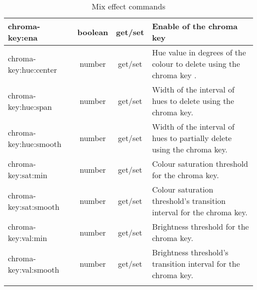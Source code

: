 \documentclass[../main.tex]{subfiles}
\begin{document}
\begin{landscape}
\begin{longtable}{|l|c|c|p{12cm}|}
    chroma-key:ena & boolean & get/set & Enable of the chroma key \\\hline
    chroma-key:hue:center & number & get/set & Hue value in degrees of the colour to delete using the chroma key .\\\hline
    chroma-key:hue:span & number & get/set & Width of the interval of hues to delete using the chroma key. \\\hline
    chroma-key:hue:smooth & number & get/set & Width of the interval of hues to partially delete using the chroma key. \\\hline
    chroma-key:sat:min & number & get/set & Colour saturation threshold for the chroma key. \\\hline
    chroma-key:sat:smooth & number & get/set &  Colour saturation threshold's transition interval for the chroma key. \\\hline
    chroma-key:val:min & number & get/set & Brightness threshold for the chroma key. \\\hline
    chroma-key:val:smooth & number & get/set &  Brightness threshold's transition interval for the chroma key. \\\hline
    
    \caption{Mix effect commands}
    \label{tab:keyer_commands}
\end{longtable}
\end{landscape}
\end{document}
